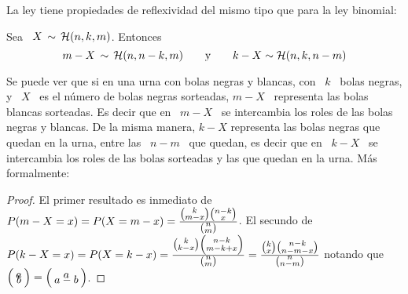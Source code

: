 La ley tiene propiedades de reflexividad del mismo tipo que para la ley binomial:
%
\begin{lema}[Reflexividad]
\label{Lem:MP:ReflexividadHipergeometrica}
%
  Sea \ $X \, \sim \, \mathcal{H}(n,k,m)$. Entonces
  \[
  m-X \, \sim \, \mathcal{H}(n,n-k,m) \qquad \mbox{y} \qquad k-X \sim \mathcal{H}(n,k,n-m)
  \]
\end{lema}
%
Se puede ver  que si en una urna con  bolas negras y blancas, con  \ $k$ \ bolas
negras, y \ $X$  \ es el n\'umero de bolas negras  sorteadas, $m-X$ \ representa
las bolas blancas sorteadas. Es decir que  en \ $m-X$ \ se intercambia los roles
de las bolas  negras y blancas.  De la misma manera,  $k-X$ representa las bolas
negras que quedan en la urna, entre las  \ $n-m$ \ que quedan, es decir que en \
$k-X$ \ se intercambia  los roles de las bolas sorteadas y  las que quedan en la
urna. M\'as formalmente:
%
\begin{proof}
  El  primer   resultado  es  inmediato  de  $P(m-X   =  x)  =  P(X   =  m-x)  =
  \frac{\smallbino{k}{m-x} \smallbino{n-k}{x}}{\smallbino{n}{m}}$. El secundo de
  $P(k-X    =     x)    =     P(X    =    k-x)     =    \frac{\smallbino{k}{k-x}
    \smallbino{n-k}{m-k+x}}{\smallbino{n}{m}}      =      \frac{\smallbino{k}{x}
    \smallbino{n-k}{n-m-x}}{\smallbino{n}{n-m}}$  notando   que  $\bino{a}{b}  =
  \bino{a}{a-b}$.
\end{proof}



